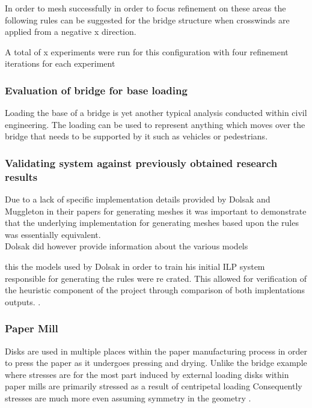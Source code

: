 \cite{CrosswindsOnSuspensionBridges}

In order to mesh successfully in order to focus refinement on these areas the following rules can be suggested for the bridge structure when crosswinds are applied from a negative x direction.


A total of x experiments were run for this configuration with four refinement iterations for each experiment

 


\subsubsection{Evaluation of bridge for base loading}
Loading the base of a bridge is yet another typical analysis conducted within civil engineering. The loading can be used to represent anything which moves over the bridge that needs to be supported by it such as vehicles or pedestrians. 


\subsubsection{Validating system against previously obtained research results}
Due to a lack of specific implementation details provided by Dolsak and Muggleton in their papers for generating meshes it was important to demonstrate that the underlying implementation for generating meshes based upon the rules was essentially equivalent. \\ 


Dolsak did however provide information about the various models 

this the models used by Dolsak in order to train his initial ILP system responsible for generating the rules were re crated. This allowed for verification of the heuristic component of the project through comparison of both implentations outputs. \cite{DolsakPaper91}.


\subsubsection{Paper Mill}
Disks are used in multiple places within the paper manufacturing process in order to press the paper as it undergoes pressing and drying. Unlike the bridge example where stresses are for the most part induced by external loading disks within paper mills are primarily stressed as a result of centripetal loading \cite{} Consequently stresses are much more even assuming symmetry in the geometry \cite{RotatingDiskFE}.


